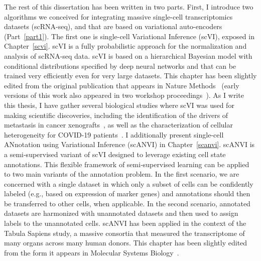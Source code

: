 The rest of this dissertation has been written in two parts. First, I introduce two algorithms we conceived for integrating massive single-cell transcriptomics datasets (scRNA-seq), and that are based on variational auto-encoders (Part~\ref{part1}). The first one is single-cell Variational Inference (scVI), exposed in Chapter~\ref{scvi}. scVI is a fully probabilistic approach for the normalization and analysis of scRNA-seq data. scVI is based on a hierarchical Bayesian model with conditional distributions specified by deep neural networks and that can be trained very efficiently even for very large datasets. This chapter has been slightly edited from the original publication that appears in Nature Methods~\cite{scvi} (early versions of this work also appeared in two workshop proceedings~\cite{MLCB,baylearn}). As I write this thesis, I have gather several biological studies where scVI was used for making scientific discoveries, including the identification of the drivers of metastasis in cancer xenografts~\cite{quinn2021single}, as well as the characterization of cellular heterogeneity for COVID-19 patients~\cite{ballestar2020single}. I additionally present single-cell ANnotation using Variational Inference (scANVI) in Chapter~\ref{scanvi}. scANVI is a semi‐supervised variant of scVI designed to leverage existing cell state annotations. This flexible framework of semi‐supervised learning can be applied to two main variants of the annotation problem. In the first scenario, we are concerned with a single dataset in which only a subset of cells can be confidently labeled (e.g., based on expression of marker genes) and annotations should then be transferred to other cells, when applicable. In the second scenario, annotated datasets are harmonized with unannotated datasets and then used to assign labels to the unannotated cells. scANVI has been applied in the context of the Tabula Sapiens study, a massive consortia that measured the transcriptome of many organs across many human donors. This chapter has been slightly edited from the form it appears in Molecular Systems Biology~\cite{Xu2019}. 

